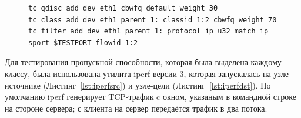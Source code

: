         \begin{figure}[ht!]
    		\center
    		\begin{lstlisting}[frame=lines,
    						  caption={Список команд для конфигурации дисциплины обслуживания CBWFQ.},
    						  label={lst:tccmd},
    						  style=tcstyle]
tc qdisc add dev eth1 cbwfq default weight 30
tc class add dev eth1 parent 1: classid 1:2 cbwfq weight 70
tc filter add dev eth1 parent 1: protocol ip u32 match ip sport $TESTPORT flowid 1:2
    		\end{lstlisting}
        \end{figure}
		Для тестирования пропускной способности, которая была выделена каждому классу,
		была использована утилита iperf версии 3, которая запускалась на узле-источнике (Листинг~\ref{lst:iperfsrc}) и
		узле-цели (Листинг~\ref{lst:iperfdst}). По умолчанию iperf генерирует TCP-трафик c окном,
		указаным в командной строке на стороне сервера; с клиента на сервер передаётся трафик в два потока.

